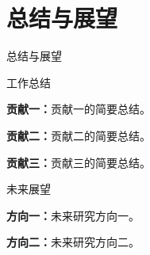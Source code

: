 \section{总结与展望}

\begin{frame}{总结与展望}

  \begin{block}{工作总结}
    \begin{compactitem}
      \item \textbf{贡献一：}贡献一的简要总结。
      \item \textbf{贡献二：}贡献二的简要总结。
      \item \textbf{贡献三：}贡献三的简要总结。
    \end{compactitem}
  \end{block}

  \vspace{0.20cm}
  \begin{exampleblock}{未来展望}
    \begin{compactitem}
      \item \textbf{方向一：}未来研究方向一。
      \item \textbf{方向二：}未来研究方向二。
    \end{compactitem}
  \end{exampleblock}
\end{frame}
